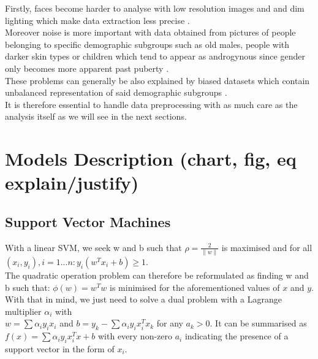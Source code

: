 \documentclass[a4paper,12pt,twoside,twocolumn]{article}
\begin{document}
Firstly, faces become harder to analyse with low resolution images and and dim lighting which make data extraction less precise \autocite{gender_classify_facehop}.\\

Moreover noise is more important with data obtained from pictures of people belonging to specific demographic subgroups such as old males, people with darker skin types \autocite{face_detect_disparity} or children which tend to appear as androgynous since gender only becomes more apparent past puberty \autocite{gender_classify_children}.\\

These problems can generally be also explained by biased datasets which contain unbalanced representation of said demographic subgroups \autocite{face_detect_bias}.\\

It is therefore essential to handle data preprocessing with as much care as the analysis itself as we will see in the next sections.\\

\section{Models Description (chart, fig, eq explain/justify)}
\label{sec:org45c1695}
\subsection{Support Vector Machines}
\label{sec:org77cd0f3}

With a linear SVM, we seek w and b such that \(\rho = \frac{2}{\|w\|}\) is maximised and for all \((x_i, y_i), i = 1...n: y_i(w^T x_i + b) \geq 1\).\\

The quadratic operation problem can therefore be reformulated as finding w and b such that: \(\phi(w) = w^Tw\) is minimised for the aforementioned values of \(x\) and \(y\).\\

With that in mind, we just need to solve a dual problem with a Lagrange multiplier \(\alpha_i\) with\\
\(w = \sum \alpha_i y_i x_i\) and \(b = y_k - \sum \alpha_i y_i x_i^Tx_k\) for any \(a_k > 0\). It can be summarised as \(f(x) = \sum \alpha_i y_i x_i^Tx + b\) with every non-zero \(a_i\) indicating the presence of a support vector in the form of \(x_i\).\\
\end{document}
